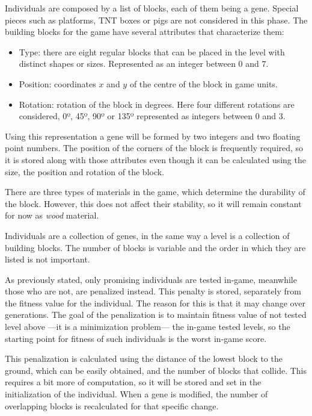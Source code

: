 \documentclass[runningheads,a4paper]{llncs}
\begin{document}
Individuals are composed by a list of blocks, each of them being a gene. 
Special pieces such as platforms, TNT boxes or pigs are not considered in this 
phase. The building blocks for the game have several attributes that 
characterize them: 

\begin{itemize}
	\item Type: there are eight regular blocks that can be placed in the level 
	with distinct shapes or sizes. Represented as an integer between $0$ and 
	$7$.
	\item Position: coordinates $x$ and $y$ of the centre of the block in game 
	units.
	\item Rotation: rotation of the block in degrees. Here four different 
	rotations are considered, 0º, 45º, 90º or 135º represented as integers 
	between $0$ and $3$.
\end{itemize}

Using this representation a gene will be formed by two integers and two 
floating point numbers.
The position of the corners of the block is frequently required, so it is 
stored along with those attributes even though it can be calculated using the 
size, the position and rotation of the block. 

There are three types of materials in the game, which determine the durability 
of the block. However, this does not affect their stability, so it will remain 
constant for now as \textit{wood} material.

Individuals are a collection of genes, in the same way a level is a collection 
of building blocks. The number of blocks is variable and the order in which 
they are listed is not important. 

As previously stated, only promising individuals are tested in-game, meanwhile 
those who are not, are penalized instead. This penalty is stored, separately 
from the fitness value for the individual. The reason for this is that it may 
change over generations. The goal of the penalization is to maintain fitness 
value of not tested level above ---it is a minimization problem--- the in-game 
tested levels, so the starting point for fitness of such individuals is the 
worst in-game score.

This penalization is calculated using the distance of the lowest block to the 
ground, which can be easily obtained, and the number of blocks that collide. 
This requires a bit more of computation, so it will be stored and set in the 
initialization of the individual. When a gene is modified, the number of 
overlapping blocks is recalculated for that specific change.
\end{document}
